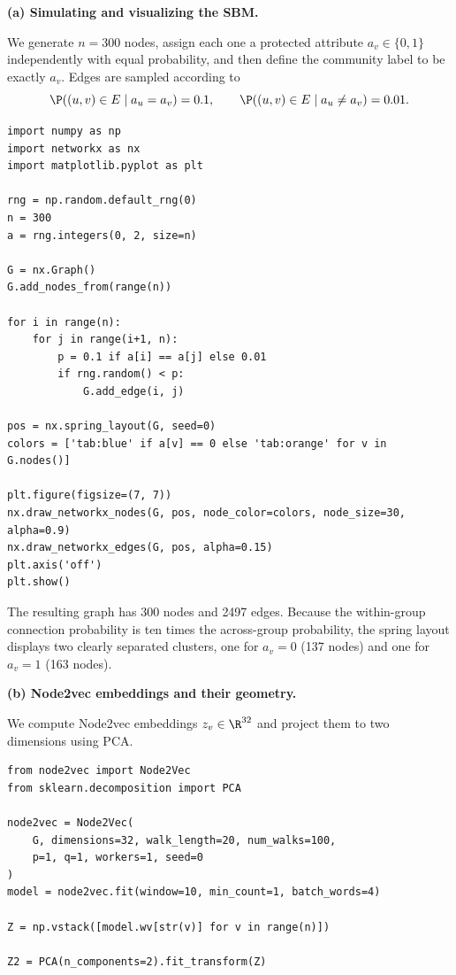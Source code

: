 \documentclass{article}
\begin{document}
\begin{tcolorbox}[colback=white, colframe=black!75, breakable, title=\textbf{Solution to Exercise 3}]
\textbf{(a) Simulating and visualizing the SBM.}

We generate $n=300$ nodes, assign each one a protected attribute $a_v\in\{0,1\}$ independently with equal probability, and then define the community label to be exactly $a_v$. Edges are sampled according to
\[
\P((u,v)\in E \mid a_u=a_v)=0.1,
\qquad
\P((u,v)\in E \mid a_u\neq a_v)=0.01.
\]

\begin{lstlisting}[style=python2]
import numpy as np
import networkx as nx
import matplotlib.pyplot as plt

rng = np.random.default_rng(0)
n = 300
a = rng.integers(0, 2, size=n)

G = nx.Graph()
G.add_nodes_from(range(n))

for i in range(n):
    for j in range(i+1, n):
        p = 0.1 if a[i] == a[j] else 0.01
        if rng.random() < p:
            G.add_edge(i, j)

pos = nx.spring_layout(G, seed=0)
colors = ['tab:blue' if a[v] == 0 else 'tab:orange' for v in G.nodes()]

plt.figure(figsize=(7, 7))
nx.draw_networkx_nodes(G, pos, node_color=colors, node_size=30, alpha=0.9)
nx.draw_networkx_edges(G, pos, alpha=0.15)
plt.axis('off')
plt.show()
\end{lstlisting}

The resulting graph has 300 nodes and 2497 edges. Because the within-group connection probability is ten times the across-group probability, the spring layout displays two clearly separated clusters, one for $a_v=0$ (137 nodes) and one for $a_v=1$ (163 nodes).

\bigskip
\textbf{(b) Node2vec embeddings and their geometry.}

We compute Node2vec embeddings $z_v\in\R^{32}$ and project them to two dimensions using PCA.

\begin{lstlisting}[style=python2]
from node2vec import Node2Vec
from sklearn.decomposition import PCA

node2vec = Node2Vec(
    G, dimensions=32, walk_length=20, num_walks=100,
    p=1, q=1, workers=1, seed=0
)
model = node2vec.fit(window=10, min_count=1, batch_words=4)

Z = np.vstack([model.wv[str(v)] for v in range(n)])

Z2 = PCA(n_components=2).fit_transform(Z)


\end{lstlisting}
\end{tcolorbox}
\end{document}
